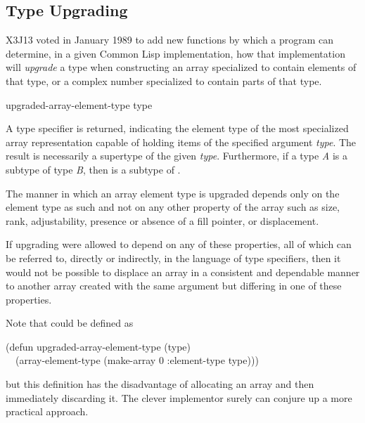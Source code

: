 \begin{new}

\section{Type Upgrading}

X3J13 voted in January 1989
to add new functions by which a program
can determine, in a given Common Lisp implementation, how that
implementation will \emph{upgrade} a type when constructing an array
specialized to contain elements of that type,
or a complex number specialized to contain parts of that type.


\begin{defun}[Function]
upgraded-array-element-type type

A type specifier is returned, indicating the element type
of the most specialized array representation capable of holding
items of the specified argument \emph{type}.
The result is necessarily a supertype of the given \emph{type}.
Furthermore, if a type \emph{A} is a subtype of type \emph{B}, then
 is a subtype of
.

The manner in which an array element type is upgraded depends
only on the element type as such and not on any other property of
the array such as size, rank, adjustability,
presence or absence of a fill pointer, or displacement.

\beforenoterule
\begin{rationale}
If upgrading were allowed to depend on any of these properties,
all of which can be referred to, directly or indirectly, in the
language of type specifiers, then it would not be possible
to displace an array in a consistent and dependable manner
to another array created with the same  argument
but differing in one of these properties.
\end{rationale}
\afternoterule

Note that  could be defined as
\begin{lisp}
(defun upgraded-array-element-type (type) \\
~~(array-element-type (make-array 0 :element-type type)))
\end{lisp}
but this definition has the disadvantage of allocating an array and
then immediately discarding it.  The clever implementor surely can
conjure up a more practical approach.
\end{defun}



\end{new}
